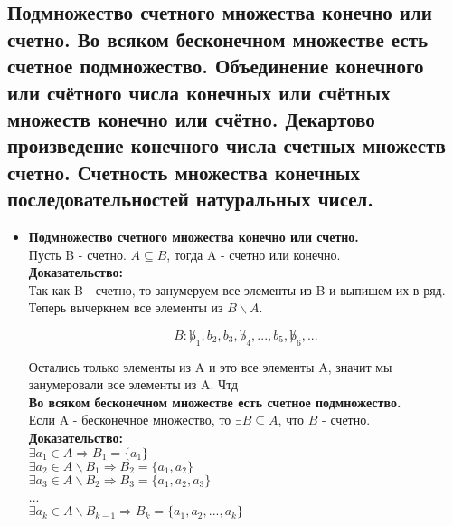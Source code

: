 \subsection{Подмножество счетного множества конечно или счетно. Во всяком бесконечном множестве есть счетное подмножество. Объединение конечного или счётного числа конечных или счётных множеств конечно или счётно. Декартово произведение конечного числа счетных множеств счетно. Счетность множества конечных последовательностей натуральных чисел.}

\begin{itemize}
	\item \textbf{Подмножество счетного множества конечно или счетно.}\\

Пусть B - счетно. $A \subseteq B$, тогда A - счетно или конечно.\\

\noindent \textbf{Доказательство:} \\

Так как B - счетно, то занумеруем все элементы из B и выпишем их в ряд. Теперь вычеркнем все элементы из $B \backslash A$.

\begin{equation*}
    B : \not b_1, b_2, b_3, \not b_4, ..., b_5, \not b_6, ...
\end{equation*}

Остались только элементы из A и это все элементы A, значит мы занумеровали все элементы из A. Чтд\\

\textbf{Во всяком бесконечном множестве есть счетное подмножество.}\\

Если A - бесконечное множество, то $\exists B \subseteq A$, что $B$ - счетно.\\

\noindent \textbf{Доказательство:}\\

$\exists a_1 \in A \Rightarrow B_1 = \{a_1\}$\\

$\exists a_2 \in A \backslash B_1 \Rightarrow B_2 = \{a_1, a_2\}$\\

$\exists a_3 \in A \backslash B_2 \Rightarrow B_3 = \{a_1, a_2, a_3\}$\\

...\\

$\exists a_k \in A \backslash B_{k - 1} \Rightarrow B_k = \{a_1, a_2, ..., a_k\}$\\


\end{itemize}
